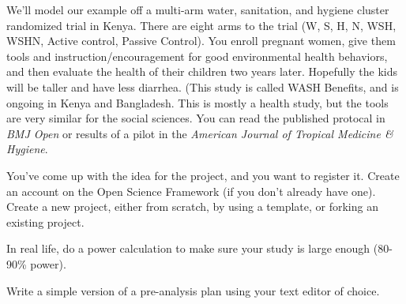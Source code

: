 \documentclass[addpoints,10pt]{exam}
\begin{document}
We'll model our example off a multi-arm water, sanitation, and hygiene cluster randomized trial in Kenya. There are eight arms to the trial (W, S, H, N, WSH, WSHN, Active control, Passive Control). You enroll pregnant women, give them tools and instruction/encouragement for good environmental health behaviors, and then evaluate the health of their children two years later. Hopefully the kids will be taller and have less diarrhea. (This study is called WASH Benefits, and is ongoing in Kenya and Bangladesh. This is mostly a health study, but the tools are very similar for the social sciences. You can read the published protocal in \textit{BMJ Open} or results of a pilot in the \textit{American Journal of Tropical Medicine \& Hygiene}.
\begin{questions}

\question
You've come up with the idea for the project, and you want to register it. Create an account on the Open Science Framework (if you don't already have one). Create a new project, either from scratch, by using a template, or forking an existing project.

\question
In real life, do a power calculation to make sure your study is large enough (80-90\% power). 

\question
Write a simple version of a pre-analysis plan using your text editor of choice.
\end{questions}
\end{document}
